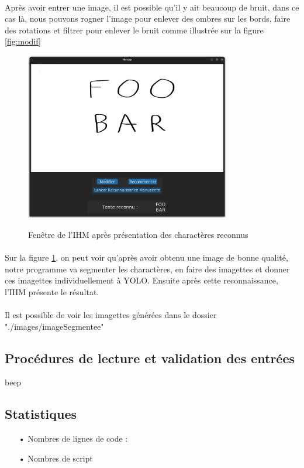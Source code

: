 \documentclass[a4paper]{article}
\begin{document}
			\paragraph{}
				Après avoir entrer une image, il est possible qu'il y ait beaucoup de bruit, dans ce cas là, nous pouvons rogner l'image pour enlever des ombres sur les bords, faire des rotations et filtrer pour enlever le bruit comme illustrée sur la figure \ref{fig:modif}
			\begin{figure}[H]
				\caption{Fenêtre de l'IHM après présentation des charactères reconnus}
				\includegraphics[width=0.8\textwidth]{recon.png}
				\centering
				\label{fig:recon}
			\end{figure}
			\paragraph{}Sur la figure \ref{fig:recon}, on peut voir qu'après avoir obtenu une image de bonne qualité, notre programme va segmenter les charactères, en faire des imagettes et donner ces imagettes individuellement à YOLO. Ensuite après cette reconnaissance, l'IHM présente le résultat.
			\paragraph{}Il est possible de voir les imagettes générées dans le dossier "./images/imageSegmentee"
		\subsection{Procédures de lecture et validation des entrées}
			beep	
		\subsection{Statistiques}
			\begin{itemize}
				\item[•] Nombres de lignes de code : 
				\item[•] Nombres de script
			\end{itemize}
\end{document}
